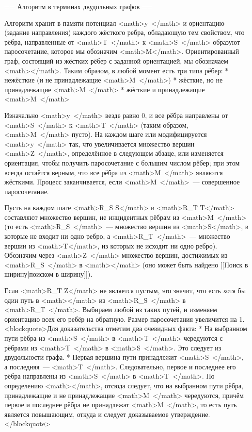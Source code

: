 \documentclass[discrete.tex]{subfiles}
\begin{document}
== Алгоритм в терминах двудольных графов ==

Алгоритм хранит в памяти потенциал <math>y\ </math> и ориентацию (задание направления) каждого жёсткого ребра, обладающую тем свойством, что рёбра, направленные от <math>T\ </math> к <math>S\ </math> образуют паросочетание, которое мы обозначим <math>M</math>.
Ориентированный граф, состоящий из жёстких рёбер с заданной ориентацией, мы обозначаем <math></math>.
Таким образом, в любой момент есть три типа рёбер:
* нежёсткие (и не принадлежащие <math>M\ </math>)
* жёсткие, но не принадлежащие <math>M\ </math>
* жёсткие и принадлежащие <math>M\ </math>

Изначально <math>y\ </math> везде равно 0, и все рёбра направлены от <math>S\ </math> к <math>T\ </math> (таким образом, <math>M\ </math> пусто).
На каждом шаге или модифицируется <math>y\ </math> так, что увеличивается множество вершин <math>Z\ </math>, определённое в следующем абзаце, или изменяется ориентация, чтобы получить паросочетание с большим числом рёбер;
при этом всегда остаётся верным, что все рёбра из <math>M\ </math> являются жёсткими.
Процесс заканчивается, если <math>M\ </math> — совершенное паросочетание.

Пусть на каждом шаге <math>R_S \subseteq S</math> и <math>R_T \subseteq T</math> составляют множество вершин, не инцидентных рёбрам из <math>M\ </math> (то есть <math>R_S\ </math> — множество вершин из <math>S</math>, в которые не входит ни одно ребро, а <math>R_T\ </math> — множество вершин из <math>T</math>, из которых не исходит ни одно ребро).
Обозначим через <math>Z\ </math> множество вершин, достижимых из <math>R_S\ </math> в <math></math> (оно может быть найдено [[Поиск в ширину|поиском в ширину]]).

Если <math>R_T \cap Z</math> не является пустым, это значит, что есть хотя бы один путь в <math></math> из <math>R_S\ </math> в <math>R_T\ </math>. Выбираем любой из таких путей, и изменяем ориентацию всех его ребёр на обратную. Размер паросочетания увеличится на 1. <blockquote>Для доказательства отметим два очевидных факта:
* На выбранном пути рёбра из <math>S\ </math> в <math>T\ </math> чередуются с рёбрами из <math>T\ </math> в <math>S\ </math>. Это следует из двудольности графа.
* Первая вершина пути принадлежит <math>S\ </math>, а последняя — <math>T\ </math>. Следовательно, первое и последнее его рёбра направлены из <math>S\ </math> в <math>T\ </math>.
По определению <math></math>, отсюда следует, что на выбранном пути рёбра, принадлежащие и не принадлежащие <math>M\ </math> чередуются, причём первое и последнее рёбра не принадлежат <math>M\ </math>, то есть путь является повышающим, откуда и следует доказываемое утверждение.
</blockquote>
\end{document}
